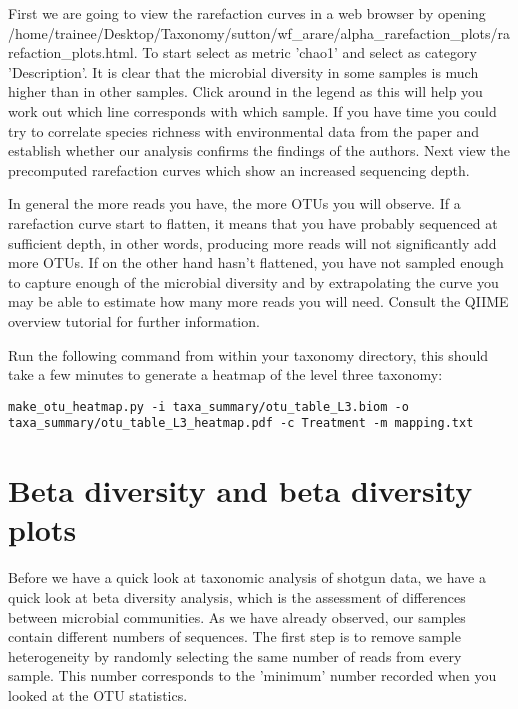 First we are going to view the rarefaction curves in a web browser by opening /home/trainee/Desktop/Taxonomy/sutton/wf\_arare/alpha\_rarefaction\_plots/rarefaction\_plots.html. 
To start select as metric 'chao1' and select as category 'Description'. It is clear that the microbial diversity in some samples is much higher than in other samples. Click around in the legend as this will help you work out which line corresponds with which sample. If you have time you could try to correlate species richness with environmental data from the paper and establish whether our analysis confirms the findings of the authors.
Next view the precomputed rarefaction curves which show an increased sequencing depth.

In general the more reads you have, the more OTUs you will observe. If a rarefaction curve start to flatten, it means that you have probably sequenced at sufficient depth, in other words, producing more reads will not significantly add more OTUs. If on the other hand hasn't flattened, you have not sampled enough to capture enough of the microbial diversity and by extrapolating the curve you may be able to estimate how many more reads you will need. Consult the QIIME overview tutorial for further information.

\begin{steps}
Run the following command from within your taxonomy directory, this should take a few minutes to generate a heatmap of the level three taxonomy:
\begin{lstlisting}
make_otu_heatmap.py -i taxa_summary/otu_table_L3.biom -o taxa_summary/otu_table_L3_heatmap.pdf -c Treatment -m mapping.txt
\end{lstlisting}
\end{steps}

\section{Beta diversity and beta diversity plots}

Before we have a quick look at taxonomic analysis of shotgun data, we have a quick look at beta diversity analysis, which is the assessment of differences between microbial communities. As we have already observed, our samples contain different numbers of sequences. 
The first step is to remove sample heterogeneity by randomly selecting the same number of reads from every sample. This number corresponds to the 'minimum' number recorded when you looked at the OTU statistics. 

